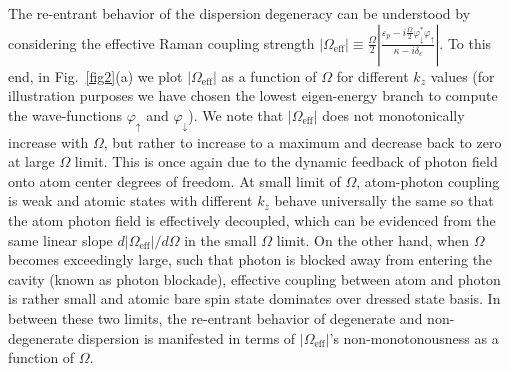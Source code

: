 \documentclass[atoms,article,submit,moreauthors,pdftex,12pt,a4paper]{mdpi}
\begin{document}
The re-entrant behavior of the dispersion degeneracy can be understood by considering the effective Raman coupling strength $|\Omega_\text{eff}|\equiv\frac{\Omega}{2}\left|\frac{\varepsilon_{p}-i\frac{\Omega}{2}\varphi_\downarrow^\ast\varphi_\uparrow}{\kappa-i\delta_{c}}\right|$. To this end, in Fig.~\ref{fig2}(a) we plot $|\Omega_\text{eff}|$ as a function of $\Omega$ for different $k_z$ values (for illustration purposes we have chosen the lowest eigen-energy branch to compute the wave-functions $\varphi_\uparrow$ and $\varphi_\downarrow$). We note that $|\Omega_\text{eff}|$ does not monotonically increase with $\Omega$, but rather to increase to a maximum and decrease back to zero at large $\Omega$ limit. This is once again due to the dynamic feedback of photon field onto atom center degrees of freedom. At small limit of $\Omega$, atom-photon coupling is weak and atomic states with different $k_z$ behave universally the same so that the atom photon field is effectively decoupled, which can be evidenced from the same linear slope $d|\Omega_\text{eff}|/d\Omega$ in the small $\Omega$ limit. On the other hand, when $\Omega$ becomes exceedingly large, such that photon is blocked away from entering the cavity (known as photon blockade), effective coupling between atom and photon is rather small and atomic bare spin state dominates over dressed state basis. In between these two limits, the re-entrant behavior of degenerate and non-degenerate dispersion is manifested in terms of $|\Omega_\text{eff}|$'s non-monotonousness as a function of $\Omega$.

\end{document}
